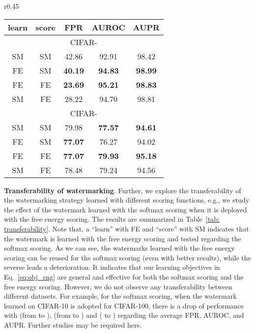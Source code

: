 \documentclass{article}
\begin{document}
\begin{wraptable}{r}{0.45\linewidth}
\centering
\caption{Transferability of watermarking across scoring functions. SM denotes softmax scoring and FE denotes free energy scoring.  } \label{tab: transferability}
\vspace{7pt}
\scriptsize{
\begin{tabular}{cc|ccc}
\toprule[1.5pt]
 learn & score & FPR      & AUROC        & AUPR       \\
\midrule[0.6pt]
\multicolumn{5}{c}{\cellcolor{greyL}CIFAR-} \\
\midrule[0.6pt]
SM & SM & 42.86 & 92.91 & 98.42 \\
FE & SM & \textbf{40.19} & \textbf{94.83} & \textbf{98.99} \\
\midrule[0.6pt]
FE & FE & \textbf{23.69} & \textbf{95.21} & \textbf{98.83} \\
SM & FE & 28.22 & 94.70 & 98.81 \\
\midrule[0.6pt]
\multicolumn{5}{c}{\cellcolor{greyL}CIFAR-} \\
\midrule[0.6pt]
SM & SM & 79.98 & \textbf{77.57} & \textbf{94.61} \\
FE & SM & \textbf{77.07} & {76.27} & {94.02} \\
\midrule[0.6pt]
FE & FE & \textbf{77.07} & \textbf{79.93} & \textbf{95.18} \\
SM & FE & 78.48 & {79.24} & {94.56} \\
\bottomrule[1.5pt]      
\end{tabular}
}
\end{wraptable}



\textbf{Transferability of watermarking}. Further, we explore the transferability of the watermarking strategy learned with different scoring functions, e.g., we study the effect of the watermark learned with the softmax scoring when it is deployed with the free energy scoring. The results are summarized in Table~\ref{tab: transferability}. {Note that, a ``learn'' with FE and ``score'' with SM indicates that the watermark is learned with the free energy scoring and tested regarding the softmax scoring.} As we can see, the watermarks learned with the free energy scoring can be reused for the softmax scoring (even with better results), while the reverse leads a deterioration. It indicates that our learning objectives in Eq.~\eqref{eq:obj_eng} are general and effective for both the softmax scoring and the free energy scoring. However, we do not observe any transferability between different datasets. For example, for the softmax scoring, when the watermark learned on CIFAR-10 is adopted for CIFAR-100, there is a drop of performance with  (from  to ),  (from  to ) and  ( to ) regarding the average FPR, AUROC, and AUPR. Further studies may be required here. 
\end{document}
